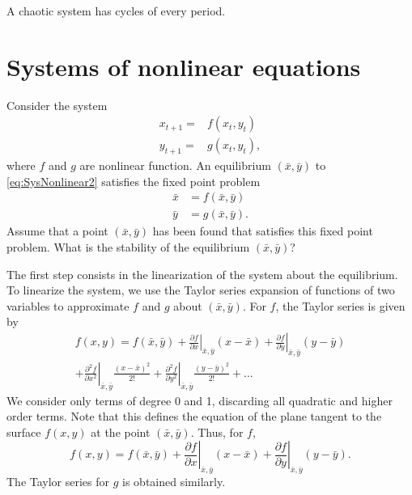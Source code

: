 A chaotic system has cycles of every period.

\section{Systems of nonlinear equations}
Consider the system
\begin{equation}
\begin{array}{cc}
x_{t+1}=& f(x_t,y_t)\\
y_{t+1}=& g(x_t,y_t),
\end{array}\label{eq:SysNonlinear2}
\end{equation}
where $f$ and $g$ are nonlinear function. An equilibrium $(\bar x, \bar y)$ to \eqref{eq:SysNonlinear2} satisfies the fixed point problem
\begin{align*}
\bar x &= f(\bar x,\bar y) \\
\bar y &= g(\bar x,\bar y).
\end{align*}
Assume that a point $(\bar x,\bar y)$ has been found that satisfies this fixed point problem. What is the stability of the equilibrium $(\bar x,\bar y)$?

The first step consists in the  linearization of the system about the equilibrium.
To linearize the system, we use the Taylor series expansion of functions of two variables to approximate $f$ and $g$ about $(\bar x, \bar y)$. For $f$, the Taylor series is given by
\begin{multline*}
f(x,y)= f(\bar x,\bar y)+\left .\frac{\partial f}{\partial x}\right |_{\bar x,\bar y}(x-\bar x)+ \left .\frac{\partial f}{\partial y}\right |_{\bar x,\bar y}(y-\bar y)\\
+ \left .\frac{\partial^2 f}{\partial x^2}\right |_{\bar x,\bar y}\frac{(x-\bar x)^2}{2!} + \left .\frac{\partial^2 f}{\partial y^2}\right |_{\bar x,\bar y}\frac{(y-\bar y)^2}{2!}+\dots
\end{multline*}
We consider only terms of degree 0 and 1, discarding all quadratic and higher order terms. Note that this defines the equation of the plane tangent to the surface $f(x,y)$ at the point $(\bar x,\bar y)$. Thus, for $f$,
$$f(x,y)= f(\bar x,\bar y)+\left .\frac{\partial f}{\partial x}\right |_{\bar x,\bar y}(x-\bar x)+ \left .\frac{\partial f}{\partial y}\right |_{\bar x,\bar y}(y-\bar y).$$
The Taylor series for $g$ is obtained similarly. 

